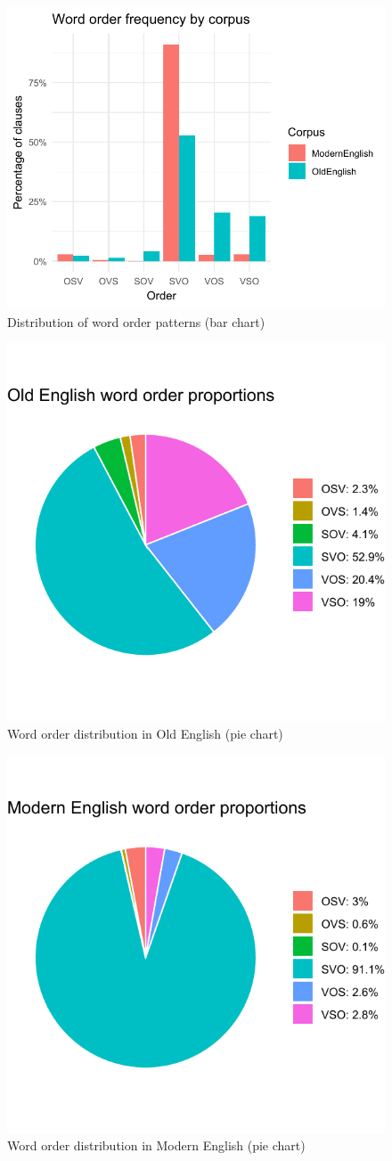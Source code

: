 \documentclass{article}
\begin{document}
\begin{figure}[H]
    \centering
    \includegraphics[width=0.8\linewidth]{bar_word_order}
    \caption{Distribution of word order patterns (bar chart)}
    \label{fig:bar_word_order}
\end{figure}

\begin{figure}[H]
    \centering
    \includegraphics[width=0.6\linewidth]{pie_old_english}
    \caption{Word order distribution in Old English (pie chart)}
    \label{fig:pie_old_english}
\end{figure}

\begin{figure}[H]
    \centering
    \includegraphics[width=0.6\linewidth]{pie_modern_english}
    \caption{Word order distribution in Modern English (pie chart)}
    \label{fig:pie_modern_english}
\end{figure}
\end{document}

